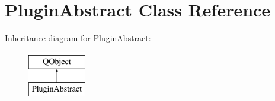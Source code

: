 \hypertarget{class_plugin_abstract}{\section{Plugin\-Abstract Class Reference}
\label{class_plugin_abstract}
}
Inheritance diagram for Plugin\-Abstract\-:\begin{figure}[H]
\begin{center}
\leavevmode
\includegraphics[height=2.000000cm]{class_plugin_abstract}
\end{center}
\end{figure}
